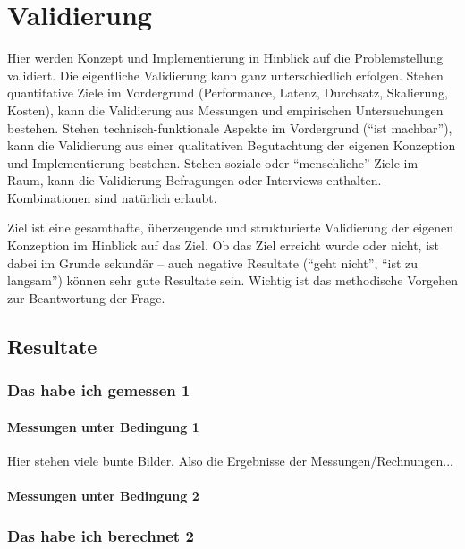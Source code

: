 \chapter{Validierung}
\label{Validierung}
Hier werden Konzept und Implementierung in Hinblick auf die
Problemstellung validiert. Die eigentliche Validierung kann ganz
unterschiedlich erfolgen. Stehen quantitative Ziele im Vordergrund
(Performance, Latenz, Durchsatz, Skalierung, Kosten), kann die
Validierung aus Messungen und empirischen Untersuchungen
bestehen. Stehen technisch-funktionale Aspekte im Vordergrund (``ist
machbar''), kann die Validierung aus einer qualitativen Begutachtung
der eigenen Konzeption und Implementierung bestehen. Stehen soziale
oder ``menschliche'' Ziele im Raum, kann die Validierung Befragungen
oder Interviews enthalten. Kombinationen sind natürlich erlaubt.

Ziel ist eine gesamthafte, überzeugende und strukturierte Validierung
der eigenen Konzeption im Hinblick auf das Ziel. Ob das Ziel erreicht
wurde oder nicht, ist dabei im Grunde sekundär – auch negative
Resultate (``geht nicht'', ``ist zu langsam'') können sehr gute
Resultate sein. Wichtig ist das methodische Vorgehen zur Beantwortung
der Frage.

\section{Resultate}

\subsection{Das habe ich gemessen 1}
\label{Ergebnisse_1}

\subsubsection{Messungen unter Bedingung 1}

Hier stehen viele bunte Bilder. Also die Ergebnisse der Messungen/Rechnungen...

\subsubsection{Messungen unter Bedingung 2}

\subsection{Das habe ich berechnet 2}
\label{Ergebnisse_2}

